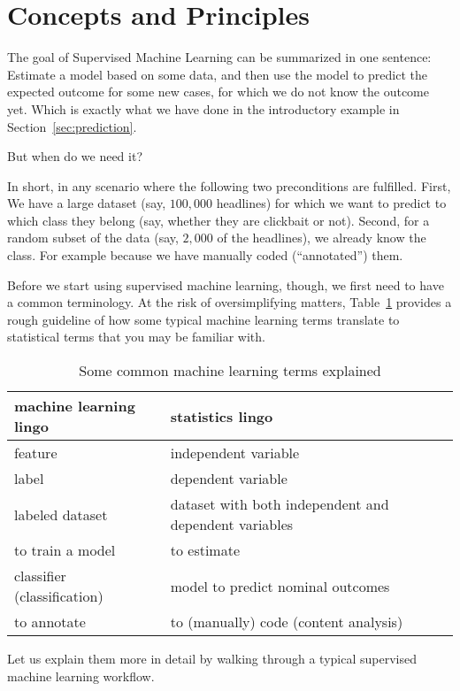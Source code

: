 \section{Concepts and Principles}

The goal of Supervised Machine Learning can be summarized in one sentence:
Estimate a model based on some data, and then use the model to predict the
expected outcome for some new cases, for which we do not know the outcome yet.
Which is exactly what we have done in the introductory example in Section~\ref{sec:prediction}.

But when do we need it?

In short, in any scenario where the following two preconditions are fulfilled.
First, We have a large dataset (say, $100,000$
headlines) for which we want to predict to which class they belong (say, whether
they are clickbait or not).
Second, for a random subset of the data (say, $2,000$ of the headlines), we already
know the class.
For example because we have manually coded (``annotated'') them.

Before we start using supervised machine learning, though, we first need to have
a common terminology.
At the risk of oversimplifying matters, Table~\ref{tab:mllingo} provides a rough
guideline of how some typical machine learning terms translate to statistical
terms that you may be familiar with.

\begin{table}
  \centering
\begin{tabularx}{\textwidth}{XX}
\toprule
machine learning lingo  & statistics lingo\\ \midrule
feature                 & independent variable  \\
label                   & dependent variable  \\
labeled dataset         & dataset with both independent and dependent variables\\
to train a model        & to estimate \\
classifier (classification)  & model to predict nominal outcomes \\
to annotate             & to (manually) code (content analysis) \\
\bottomrule
\end{tabularx}
\caption{Some common machine learning terms explained\label{tab:mllingo}}
\end{table}

Let us explain them more in detail by walking through a typical supervised
machine learning workflow.

